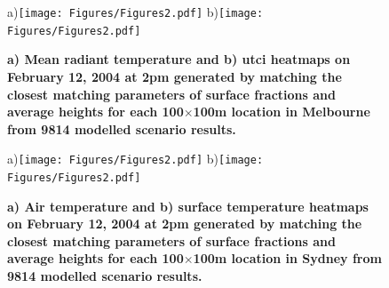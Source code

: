 \documentclass[final,3p,times,authoryear]{elsarticle}
\begin{document}


\begin{figure}
\centering
a)\texttt{[image: Figures/Figures2.pdf]}
b)\texttt{[image: Figures/Figures2.pdf]}
\caption{\bf a) Mean radiant temperature and b) \gls{utci} heatmaps on February 12, 2004 at 2pm generated by matching the closest matching parameters of surface fractions and average heights for each 100$\times$100m location in Melbourne from 9814 modelled scenario results.  }
 \label{fig:TmrtMelb}
 \label{fig:utciMelb}
\end{figure}




\begin{figure}
\centering
a)\texttt{[image: Figures/Figures2.pdf]}
b)\texttt{[image: Figures/Figures2.pdf]}
\caption{\bf a) Air temperature and b) surface temperature heatmaps on February 12, 2004 at 2pm generated by matching the closest matching parameters of surface fractions and average heights for each 100$\times$100m location in Sydney from 9814 modelled scenario results.  }
 \label{fig:TaSyd}
\end{figure}








\end{document}
